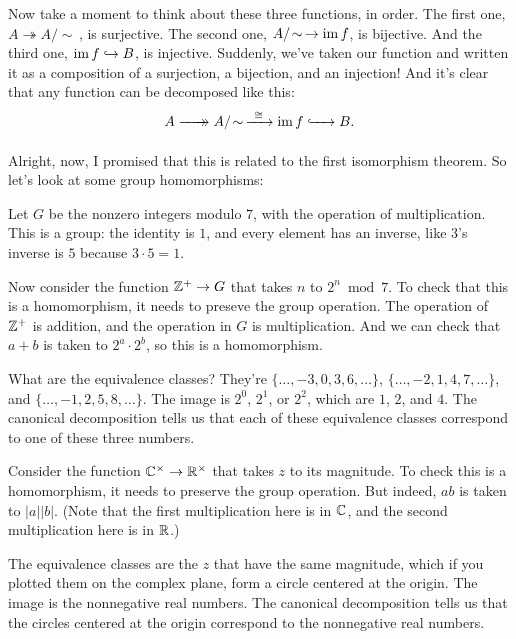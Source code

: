 \documentclass[11pt,paper=letter]{scrartcl}
\newcommand{\xrightarrowdbl}[2][]{%
  \xrightarrow[#1]{#2}\mathrel{\mkern-14mu}\rightarrow
}
\newcommand{\simm}{\!\sim\,}
\begin{document}
Now take a moment to think about these three functions, in order. The first one, $A \twoheadrightarrow A/\simm$, is surjective. The second one, $A/\simm \to \im f$, is bijective. And the third one, $\operatorname{im} f \hookrightarrow B$, is injective. Suddenly, we've taken our function and written it as a composition of a surjection, a bijection, and an injection! And it's clear that any function can be decomposed like this:
\[
A \xrightarrowdbl{\phantom{xxx}} A/\simm
\xrightarrow[\phantom{xxx}]{\cong} \im f
\xhookrightarrow{\phantom{xxx}} B.
\]

Alright, now, I promised that this is related to the first isomorphism theorem. So let's look at some group homomorphisms:

\begin{example*}
Let $G$ be the nonzero integers modulo $7$, with the operation of multiplication. This is a group: the identity is $1$, and every element has an inverse, like $3$'s inverse is $5$ because $3 \cdot 5 = 1$.

Now consider the function $\mathbb Z^+ \to G$ that takes $n$ to $2^n \bmod 7$. To check that this is a homomorphism, it needs to preseve the group operation. The operation of $\mathbb Z^+$ is addition, and the operation in $G$ is multiplication. And we can check that $a + b$ is taken to $2^a \cdot 2^b$, so this is a homomorphism.

What are the equivalence classes? They're $\{\ldots, -3, 0, 3, 6, \ldots\}$, $\{\ldots, -2, 1, 4, 7, \ldots\}$, and $\{\ldots, -1, 2, 5, 8, \ldots\}$. The image is $2^0$, $2^1$, or $2^2$, which are $1$, $2$, and $4$. The canonical decomposition tells us that each of these equivalence classes correspond to one of these three numbers.
\end{example*}

\begin{example*}
Consider the function $\mathbb C^{\times} \to \mathbb R^{\times}$ that takes $z$ to its magnitude. To check this is a homomorphism, it needs to preserve the group operation. But indeed, $ab$ is taken to $|a||b|$. (Note that the first multiplication here is in $\mathbb C$, and the second multiplication here is in $\mathbb R$.)

The equivalence classes are the $z$ that have the same magnitude, which if you plotted them on the complex plane, form a circle centered at the origin. The image is the nonnegative real numbers. The canonical decomposition tells us that the circles centered at the origin correspond to the nonnegative real numbers.
\end{example*}
\end{document}
